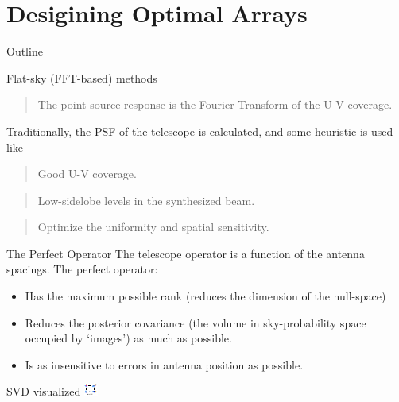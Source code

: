 \documentclass[ignorenonframetext]{beamer}
\begin{document}
\section{Desigining Optimal Arrays}

\begin{frame}{Outline}
\tableofcontents[currentsection]
\end{frame}

\begin{frame}{Flat-sky (FFT-based) methods}
 \begin{quote}
  The point-source response is the Fourier Transform of the U-V coverage.
 \end{quote}
 Traditionally, the PSF of the telescope is calculated, and some heuristic is used like
 \begin{quote}
  Good U-V coverage.
 \end{quote}
 \begin{quote}
  Low-sidelobe levels in the synthesized beam.
 \end{quote}
 \begin{quote}
  Optimize the uniformity and spatial sensitivity.
 \end{quote}
 
\end{frame}

\begin{frame}{The Perfect Operator}
 The telescope operator is a function of the antenna spacings. The perfect operator:
 \begin{itemize}
  \item Has the maximum possible rank (reduces the dimension of the null-space)
  \item Reduces the posterior covariance (the volume in sky-probability space occupied by `images') as much as possible.
\item Is as insensitive to errors in antenna position as possible.
\end{itemize}

\end{frame}

\begin{frame}{SVD visualized}
 \includegraphics[width=0.7\linewidth]{fig/svd.pdf}
\end{frame}
\end{document}

